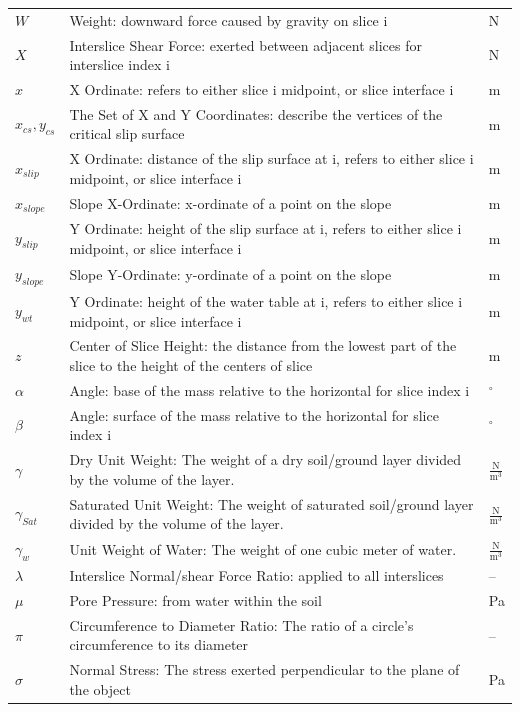\documentclass[12pt]{article}
\begin{document}
\begin{longtabu}{l X[l] l}
\\
$W$ & Weight: downward force caused by gravity on slice i & N
\\
$X$ & Interslice Shear Force: exerted between adjacent slices for interslice index i & N
\\
$x$ & X Ordinate: refers to either slice i midpoint, or slice interface i & m
\\
${x_{cs}},{y_{cs}}$ & The Set of X and Y Coordinates: describe the vertices of the critical slip surface & m
\\
${x_{slip}}$ & X Ordinate: distance of the slip surface at i, refers to either slice i midpoint, or slice interface i & m
\\
${x_{slope}}$ & Slope X-Ordinate: x-ordinate of a point on the slope & m
\\
${y_{slip}}$ & Y Ordinate: height of the slip surface at i, refers to either slice i midpoint, or slice interface i & m
\\
${y_{slope}}$ & Slope Y-Ordinate: y-ordinate of a point on the slope & m
\\
${y_{wt}}$ & Y Ordinate: height of the water table at i, refers to either slice i midpoint, or slice interface i & m
\\
$z$ & Center of Slice Height: the distance from the lowest part of the slice to the height of the centers of slice & m
\\
$α$ & Angle: base of the mass relative to the horizontal for slice index i & ${}^{\circ}$
\\
$β$ & Angle: surface of the mass relative to the horizontal for slice index i & ${}^{\circ}$
\\
$γ$ & Dry Unit Weight: The weight of a dry soil/ground layer divided by the volume of the layer. & $\frac{\text{N}}{\text{m}^{3}}$
\\
${γ_{Sat}}$ & Saturated Unit Weight: The weight of saturated soil/ground layer divided by the volume of the layer. & $\frac{\text{N}}{\text{m}^{3}}$
\\
${γ_{w}}$ & Unit Weight of Water: The weight of one cubic meter of water. & $\frac{\text{N}}{\text{m}^{3}}$
\\
$λ$ & Interslice Normal/shear Force Ratio: applied to all interslices & --
\\
$μ$ & Pore Pressure: from water within the soil & Pa
\\
$π$ & Circumference to Diameter Ratio: The ratio of a circle's circumference to its diameter & --
\\
$σ$ & Normal Stress: The stress exerted perpendicular to the plane of the object & Pa

\end{longtabu}
\end{document}
